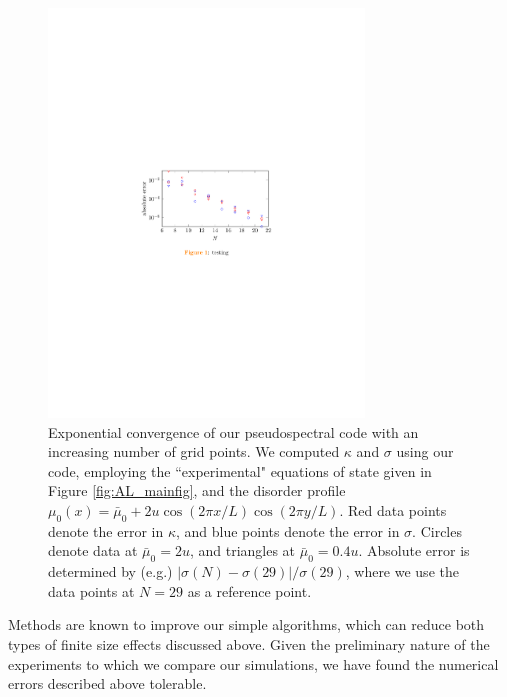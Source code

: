 \begin{figure}[t]
\centering
\includegraphics[width=3.3in]{figures/appendix/spectralplot.pdf}
\caption{Exponential convergence of our pseudospectral code with an increasing number of grid points.  We computed $\kappa$ and $\sigma$ using our  code, employing the ``experimental" equations of state given in Figure \ref{fig:AL_mainfig},  and the disorder profile $\mu_0(x) = \bar\mu_0 + 2u\cos(2\pi x/L)\cos(2\pi y/L)$.   Red data points denote the error in $\kappa$, and blue points denote the error in $\sigma$.   Circles denote data at $\bar\mu_0 = 2u$, and triangles at $\bar\mu_0 = 0.4u$.  Absolute error is determined by (e.g.) $|\sigma(N)-\sigma(29)|/\sigma(29)$,  where we use the data points at $N=29$ as a reference point.}
\label{fig:AL_spectralfig}
\end{figure}

Methods are known to improve our simple algorithms, which can reduce both types of finite size effects discussed above.   Given the preliminary nature of the experiments to which we compare our simulations, we have found the numerical errors described above tolerable.

